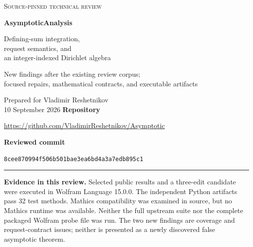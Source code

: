 \documentclass[11pt,letterpaper]{article}
\newcommand{\rev}{8cee870994f506b501bae3ea6bd4a3a7edb895c1}
\begin{document}
\begin{titlepage}
{\Large\sffamily\color{ink}\textsc{Source-pinned technical review}\par}
\vspace{0.7in}
{\Huge\bfseries\color{ink}AsymptoticAnalysis\par}
\vspace{0.2in}
{\LARGE Defining-sum integration,\\request semantics, and\\an integer-indexed Dirichlet algebra\par}
\vspace{0.35in}
{\large New findings after the existing review corpus;\\focused repairs, mathematical contracts, and executable artifacts\par}
\vspace{0.45in}
Prepared for Vladimir Reshetnikov\\
10 September 2026
\vfill
\textbf{Repository}\par
\url{https://github.com/VladimirReshetnikov/Asymptotic}\par
\textbf{Reviewed commit}\par
\texttt{\rev}\par
\medskip\hrule\medskip
\textbf{Evidence in this review.} Selected public results and a three-edit candidate
were executed in Wolfram Language 15.0.0. The independent Python artifacts pass
32 test methods. Mathics compatibility was examined in source, but no Mathics
runtime was available. Neither the full upstream suite nor the complete packaged
Wolfram probe file was run. The two new findings are coverage and request-contract
issues; neither is presented as a newly discovered false asymptotic theorem.
\end{titlepage}
\end{document}
